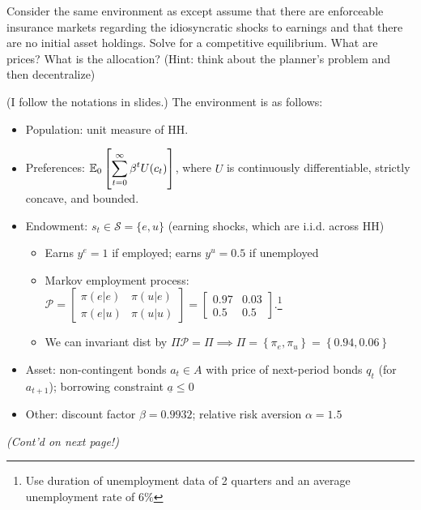 \begin{framedexercise} Consider the same environment as \citet{Huggett1993-sn} except assume
    that there are enforceable insurance markets regarding the idiosyncratic shocks
    to earnings and that there are no initial asset holdings. Solve for a competitive
    equilibrium. What are prices? What is the allocation? (Hint: think about the
    planner’s problem and then decentralize)
\end{framedexercise}

\begin{solution} (I follow the notations in slides.) The environment is as follows:
    \begin{itemize}
        \item Population: unit measure of HH.
        \item Preferences: $\mathbb{E}_0 \left[ \displaystyle\sum_{t=0}^{\infty} \beta^t U(c_t)\right]$,
              where $U$ is continuously differentiable, strictly concave, and bounded.
        \item Endowment: $s_t \in \mathcal{S} = \{e, u\}$ (earning shocks, which are i.i.d. across HH)
              \begin{itemize}
                  \item Earns $y^e = 1$ if employed; earns $y^u = 0.5$ if unemployed
                  \item Markov employment process: $\mathcal{P} = \begin{bmatrix}
                                \pi(e|e) & \pi(u|e) \\
                                \pi(e|u) & \pi(u|u)
                            \end{bmatrix} = \begin{bmatrix}
                                {0.97} & 0.03  \\
                                0.5    & {0.5}
                            \end{bmatrix}$.\footnote{Use
                            duration of unemployment data of 2 quarters and an average unemployment rate
                            of 6$\%$}
                  \item We can invariant dist by $\Pi \mathcal{P} = \Pi \implies \Pi = \left\{\pi_e, \pi_u\right\} = \left\{0.94, 0.06\right\}$
              \end{itemize}
        \item Asset: non-contingent bonds $a_t \in A$ with price of next-period bonds $q_t$ (for $a_{t+1}$); borrowing constraint $\underline{a} \leq 0$
        \item Other: discount factor $\beta = 0.9932$; relative risk aversion $\alpha = 1.5$
    \end{itemize} \textit{(Cont'd on next page!)}
    \newpage


\end{solution}
